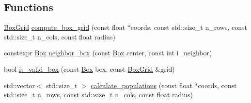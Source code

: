 \subsection*{Functions}
\begin{DoxyCompactItemize}
\item 
\hyperlink{namespaceClustering_1_1Density_structClustering_1_1Density_1_1BoxGrid}{Box\-Grid} \hyperlink{namespaceClustering_1_1Density_a07a6658238b06f32df2b108fcfa9d438}{compute\-\_\-box\-\_\-grid} (const float $\ast$coords, const std\-::size\-\_\-t n\-\_\-rows, const std\-::size\-\_\-t n\-\_\-cols, const float radius)
\item 
constexpr \hyperlink{namespaceClustering_1_1Density_a0ffd1a27b8195eaf74276ea91ef920ad}{Box} \hyperlink{namespaceClustering_1_1Density_a448fe4bc43047910281875c4e0e78b13}{neighbor\-\_\-box} (const \hyperlink{namespaceClustering_1_1Density_a0ffd1a27b8195eaf74276ea91ef920ad}{Box} center, const int i\-\_\-neighbor)
\item 
bool \hyperlink{namespaceClustering_1_1Density_ae39916e623a97a8aabf26b37cb81ab37}{is\-\_\-valid\-\_\-box} (const \hyperlink{namespaceClustering_1_1Density_a0ffd1a27b8195eaf74276ea91ef920ad}{Box} box, const \hyperlink{namespaceClustering_1_1Density_structClustering_1_1Density_1_1BoxGrid}{Box\-Grid} \&grid)
\item 
\hypertarget{namespaceClustering_1_1Density_a70bfcb6c8250fb6db892e765380c5957}{std\-::vector$<$ std\-::size\-\_\-t $>$ \hyperlink{namespaceClustering_1_1Density_a70bfcb6c8250fb6db892e765380c5957}{calculate\-\_\-populations} (const float $\ast$coords, const std\-::size\-\_\-t n\-\_\-rows, const std\-::size\-\_\-t n\-\_\-cols, const float radius)}\label{namespaceClustering_1_1Density_a70bfcb6c8250fb6db892e765380c5957}


\end{DoxyCompactItemize}
